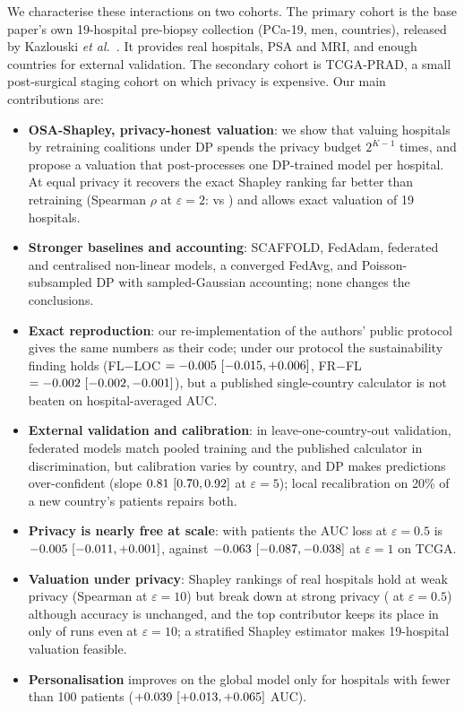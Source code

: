 \documentclass[journal]{IEEEtran}
\begin{document}
We characterise these interactions on two cohorts. The primary cohort is the base paper's own 19-hospital pre-biopsy collection (PCa-19, \pNineN{} men, \pNineCountries{} countries), released by Kazlouski \emph{et al.}\ \cite{Kazlouski2025HospitalParticipation}. It provides real hospitals, PSA and MRI, and enough countries for external validation. The secondary cohort is TCGA-PRAD, a small post-surgical staging cohort on which privacy is expensive. Our main contributions are:
\begin{itemize}
    \item \textbf{OSA-Shapley, privacy-honest valuation}: we show that valuing hospitals by retraining coalitions under DP spends the privacy budget $2^{K-1}$ times, and propose a valuation that post-processes one DP-trained model per hospital. At equal privacy it recovers the exact Shapley ranking far better than retraining (Spearman $\rho$ at $\varepsilon=2$: \osaRhoTwo{} vs \bmRhoTwo{}) and allows exact valuation of 19 hospitals.
    \item \textbf{Stronger baselines and accounting}: SCAFFOLD, FedAdam, federated and centralised non-linear models, a converged FedAvg, and Poisson-subsampled DP with sampled-Gaussian accounting; none changes the conclusions.
    \item \textbf{Exact reproduction}: our re-implementation of the authors' public protocol gives the same numbers as their code; under our protocol the sustainability finding holds (FL$-$LOC $=-0.005\ [-0.015, +0.006]$, FR$-$FL $=-0.002\ [-0.002, -0.001]$), but a published single-country calculator is not beaten on hospital-averaged AUC.
    \item \textbf{External validation and calibration}: in leave-one-country-out validation, federated models match pooled training and the published calculator in discrimination, but calibration varies by country, and DP makes predictions over-confident (slope $0.81\ [0.70, 0.92]$ at $\varepsilon=5$); local recalibration on 20\% of a new country's patients repairs both.
    \item \textbf{Privacy is nearly free at scale}: with \pNineN{} patients the AUC loss at $\varepsilon=0.5$ is $-0.005\ [-0.011, +0.001]$, against $-0.063\ [-0.087, -0.038]$ at $\varepsilon=1$ on TCGA.
    \item \textbf{Valuation under privacy}: Shapley rankings of real hospitals hold at weak privacy (Spearman \pShRhoTen{} at $\varepsilon=10$) but break down at strong privacy (\pShRhoHalf{} at $\varepsilon=0.5$) although accuracy is unchanged, and the top contributor keeps its place in only \pShTSTen{} of runs even at $\varepsilon=10$; a stratified Shapley estimator makes 19-hospital valuation feasible.
    \item \textbf{Personalisation} improves on the global model only for hospitals with fewer than 100 patients ($+0.039\ [+0.013, +0.065]$ AUC).
\end{itemize}
\end{document}
